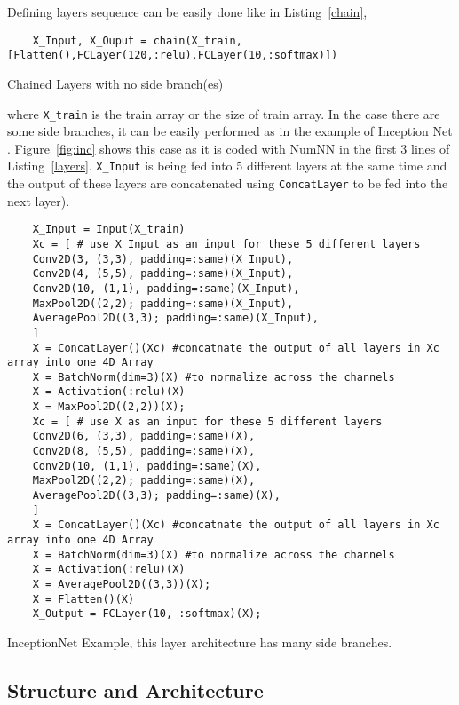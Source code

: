 Defining layers sequence can be easily done like in Listing~\ref{chain},

\begin{listing}[H]
	\begin{verbatim}
	X_Input, X_Ouput = chain(X_train,[Flatten(),FCLayer(120,:relu),FCLayer(10,:softmax)])
	\end{verbatim}
	\caption{Chained Layers with no side branch(es)}\label{chain}
\end{listing}


where \texttt{X_train} is the train array or the size of train array. In the case there are some side branches, it can be easily performed as in the example of Inception Net \cite{Szegedy2016}. Figure~\ref{fig:inc} shows this case as it is coded with NumNN in the first 3 lines of Listing~\ref{layers}. \texttt{X_Input} is being fed into 5 different layers at the same time and the output of these layers are concatenated using \texttt{ConcatLayer} to be fed into the next layer). 

\begin{listing}[!h]
	\begin{verbatim}
	X_Input = Input(X_train)
	Xc = [ # use X_Input as an input for these 5 different layers
	Conv2D(3, (3,3), padding=:same)(X_Input),
	Conv2D(4, (5,5), padding=:same)(X_Input),
	Conv2D(10, (1,1), padding=:same)(X_Input),
	MaxPool2D((2,2); padding=:same)(X_Input),
	AveragePool2D((3,3); padding=:same)(X_Input),
	]
	X = ConcatLayer()(Xc) #concatnate the output of all layers in Xc array into one 4D Array
	X = BatchNorm(dim=3)(X) #to normalize across the channels
	X = Activation(:relu)(X)
	X = MaxPool2D((2,2))(X);
	Xc = [ # use X as an input for these 5 different layers
	Conv2D(6, (3,3), padding=:same)(X),
	Conv2D(8, (5,5), padding=:same)(X),
	Conv2D(10, (1,1), padding=:same)(X),
	MaxPool2D((2,2); padding=:same)(X),
	AveragePool2D((3,3); padding=:same)(X),
	]
	X = ConcatLayer()(Xc) #concatnate the output of all layers in Xc array into one 4D Array
	X = BatchNorm(dim=3)(X) #to normalize across the channels
	X = Activation(:relu)(X)
	X = AveragePool2D((3,3))(X);
	X = Flatten()(X)
	X_Output = FCLayer(10, :softmax)(X);
	\end{verbatim}
	\caption{InceptionNet Example, this layer architecture has many side branches.}\label{layers}
\end{listing}


\subsection{Structure and Architecture}\label{subsec:saa}

